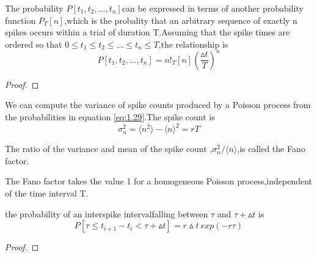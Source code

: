\begin{thm}
    The probability $P[t_1,t_2,...,t_n]$can be expressed in terms of another probability function $P_T[n]$,which is the probality that an arbitrary sequence of exactly n spikes occurs within a trial of duration T.Assuming that the spike times are ordered so that $0\leq t_1\leq t_2\leq ...\leq t_n\leq T$,the relationship is 
    \begin{equation}
        P[t_1,t_2,...,t_n]=n!{_T[n](\frac{\vartriangle t}{T})^n}
        \label{eq:1.26}
    \end{equation}
    \begin{proof}
    \end{proof}
\end{thm}

\begin{coro}
    We can compute the variance of spike counts produced by a Poisson process from the probabilities in equation \ref{eq:1.29}.The spike count is $$\sigma^2_n = \langle n^2 \rangle -\langle n  \rangle ^2=rT $$
\end{coro}

\begin{defn}
    The ratio of the variance and mean of the spike count ,$\sigma^2_n/\langle n\rangle$,is called the Fano factor.    
\end{defn}

\begin{coro}
    The Fano factor takes the value 1 for a homogeneous Poisson process,independent of the time interval T.
\end{coro}

\begin{lem}
    the probability of an interspike intervalfalling between $\tau$ and $\tau + \vartriangle t$ is 
    \begin{equation}
        P[\tau\leq t_{i+1}-t_{i}<\tau +\vartriangle t]=r\vartriangle t\ exp(-r\tau)
        \label{eq:1.31}
    \end{equation}
    \begin{proof}
    \end{proof}
\end{lem}

